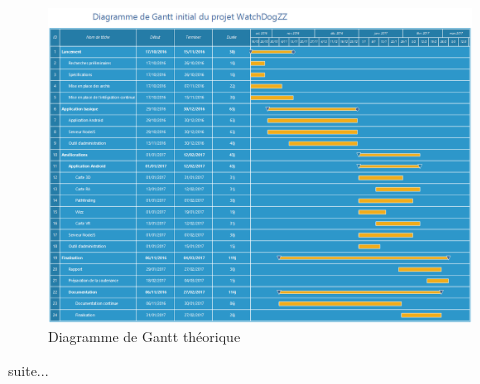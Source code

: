 \begin{landscape}
    \begin{figure}[h]
        \centering
        \includegraphics[height=\textwidth]{../gantt_initial.png}
        \caption{Diagramme de Gantt théorique}
    \end{figure}
\end{landscape}

suite...
